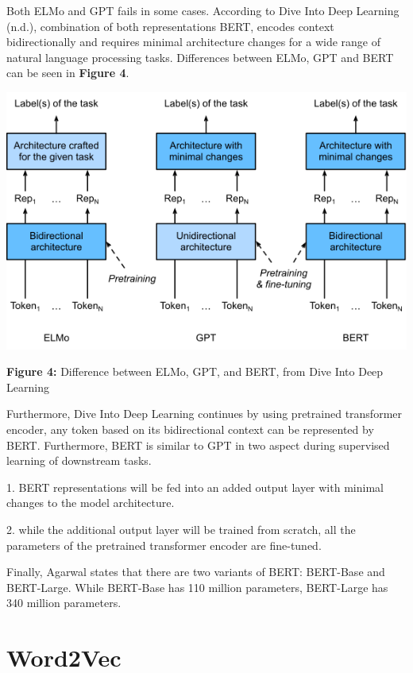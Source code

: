 \documentclass[man]{apa7}
\begin{document}
Both ELMo and GPT fails in some cases. According to Dive Into Deep Learning (n.d.), combination of both representations BERT, encodes context bidirectionally and requires minimal architecture changes for a wide range of natural language processing tasks. Differences between ELMo, GPT and BERT can be seen in \textbf{Figure 4}.
\\[2\baselineskip]

\begin{center}
\includegraphics[scale=0.6]{elmo-gpt-bert.png}

\textbf{Figure 4:} Difference between ELMo, GPT, and BERT, from Dive Into Deep Learning\\[2\baselineskip]
\end{center}

Furthermore, Dive Into Deep Learning continues by using pretrained transformer encoder, any token based on its bidirectional context can be represented by BERT. Furthermore, BERT is similar to GPT in two aspect during supervised learning of downstream tasks.

1. BERT representations will be fed into an added output layer with minimal changes to the model architecture. 

2. while the additional output layer will be trained from scratch, all the parameters of the pretrained transformer encoder are fine-tuned.

Finally, Agarwal states that there are two variants of BERT: BERT-Base and BERT-Large. While BERT-Base has 110 million parameters, BERT-Large has 340 million parameters.

\section{Word2Vec}
\end{document}
